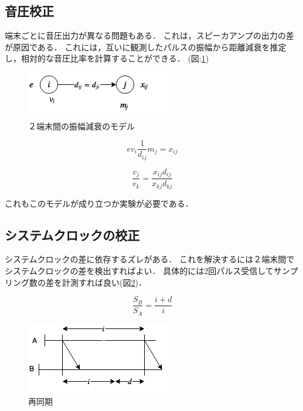 \subsection{音圧校正}

端末ごとに音圧出力が異なる問題もある．
これは，スピーカアンプの出力の差が原因である．
これには，互いに観測したパルスの振幅から距離減衰を推定し，相対的な音圧比率を計算することができる．
(図:\ref{fig:spc})

\begin{figure}[p]
  \centering
  \includegraphics[clip,width=1.05\hsize]{img/sound_pressure_calibration.png}
  \caption{２端末間の振幅減衰のモデル}\label{fig:spc}
\end{figure}

$$
ev_i \frac{1}{d_{ij}}m_j = x_{ij}
$$

$$
\frac{v_j}{v_k} = \frac{x_{ij}d_{ij}}{x_{kj}d_{kj}}
$$

これもこのモデルが成り立つか実験が必要である．


\subsection{システムクロックの校正}

システムクロックの差に依存するズレがある．
これを解決するには２端末間でシステムクロックの差を検出すればよい．
具体的には2回パルス受信してサンプリング数の差を計測すれば良い(図\ref{fig:ps2})．

$$
\frac{S_B}{S_A} = \frac{i+d}{i}
$$

\begin{figure}[p]
  \centering
  \includegraphics[clip,width=1.05\hsize]{img/phase_shift2.png}
  \caption{再同期}\label{fig:ps2}
\end{figure}

